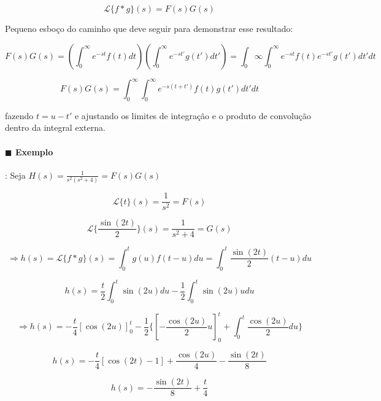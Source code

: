 \begin{equation}
\mathcal{L} \{f * g\} (s) = F(s) G(s)  
\end{equation}



\item[$\blacksquare$] Pequeno esboço do caminho que deve seguir para demonstrar esse resultado:

  \[ F(s) G(s) =  \left(  \int_{0}^{\infty} e^{-st} f(t) dt  \right) \left( \int_{0}^{\infty} e^{-st'} g(t')dt'
    \right) = \int_{0}{\infty} \int_{0}^{\infty} e^{-st} f(t) e^{-st'} g(t') dt' dt \]
  
  \[ F(s) G(s) =  \int_{0}^{\infty} \int_{0}^{\infty} e^{-s(t+t')} f(t) g(t') dt' dt \]

  fazendo \( t = u - t' \) e ajustando os limites de integração e o produto de convolução dentro da
  integral externa.


  \paragraph{$\blacksquare$ Exemplo}: Seja \( H(s) = \frac{1}{s^2(s^2 + 4)} = F(s)G(s) \) 

  \[ \mathcal{L} \{t\} (s) = \frac{1}{s^2} = F(s) \]

  \[ \mathcal{L} \{\frac{\sin(2t)}{2}\} (s) = \frac{1}{s^2 + 4} = G(s) \]

  \[ \Rightarrow h(s) = \mathcal{L} \{f * g\} (s) = \int_{0}^{t} g(u)f(t-u) du = \int_{0}^{t} \frac{\sin(2t)}{2} (t - u)du \]

  \[ h(s) = \frac{t}{2} \int_{0}^{t} \sin(2u)du - \frac{1}{2} \int_{0}^{t} \sin(2u) u du \]

  \[ \Rightarrow h(s) = -\frac{t}{4} \left[ \cos(2u) \right]_{0}^{t} - \frac{1}{2} \bigg\{ \left[ -
      \frac{\cos(2u)}{2}u \right]_{0}^{t} + \int_{0}^{t} \frac{\cos(2u)}{2} du  \bigg\} \]

  \[ h(s) = - \frac{t}{4} \left[ \cos(2t) - 1 \right] + \frac{\cos(2u)}{4}- \frac{\sin(2t)}{8} \]

  \[ h(s) = - \frac{\sin(2t)}{8} + \frac{t}{4} \]



